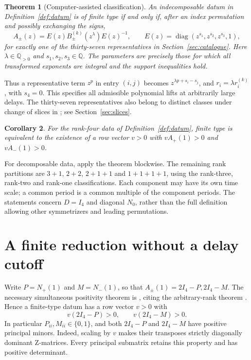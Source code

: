 \documentclass[11pt,a4paper]{article}
\newtheorem{theorem}{Theorem}[section]
\newtheorem{corollary}[theorem]{Corollary}
\theoremstyle{definition}
\DeclareMathOperator{\diag}{diag}
\newcommand{\Q}{\mathbb Q}
\begin{document}
\begin{theorem}[Computer-assisted classification]\label{thm:classification}
An indecomposable datum in Definition~\ref{def:datum} is of finite type if and
only if, after an index permutation and possibly exchanging the signs,
\begin{equation}\label{eq:family}
 A_\pm(z)=E(z)B_\pm^{(k)}(z^\lambda)E(z)^{-1},\qquad
 E(z)=\diag(z^{s_1},z^{s_2},z^{s_3},1),
\end{equation}
for exactly one of the thirty-seven representatives in
Section~\ref{sec:catalogue}. Here $\lambda\in\Q_{>0}$ and
$s_1,s_2,s_3\in\Q$. The parameters are precisely those for which all transformed
exponents are integral and the support inequalities hold.
\end{theorem}

Thus a representative term $z^p$ in entry $(i,j)$ becomes
$z^{\lambda p+s_i-s_j}$, and $r_i=\lambda r_i^{(k)}$, with $s_4=0$.
This specifies all admissible polynomial lifts at arbitrarily large delays.
The thirty-seven representatives also belong to distinct classes under change
of slices in \cite[Section 3.1]{Mizuno}; see Section~\ref{sec:slices}.

\begin{corollary}\label{cor:positivity}
For the rank-four data of Definition~\ref{def:datum}, finite type is equivalent
to the existence of a row vector $v>0$ with
$vA_+(1)>0$ and $vA_-(1)>0$.
\end{corollary}

For decomposable data, apply the theorem blockwise. The remaining rank
partitions are $3+1$, $2+2$, $2+1+1$ and $1+1+1+1$, using the rank-three,
rank-two and rank-one classifications. Each component may have its own time
scale; a common period is a common multiple of the component periods.
The statements concern $D=I_4$ and diagonal $N_0$, rather than the full
definition allowing other symmetrizers and leading permutations.

\section{A finite reduction without a delay cutoff}\label{sec:reduction}
Write $P=N_+(1)$ and $M=N_-(1)$, so that $A_\pm(1)=2I_4-P,2I_4-M$.
The necessary simultaneous positivity theorem is
\cite[Lemma 3.3]{Mizuno}, citing the arbitrary-rank theorem
\cite[Theorem 5.5]{TData}. Hence a finite-type datum has a row vector $v>0$ with
\begin{equation}\label{eq:positive}
 v(2I_4-P)>0,\qquad v(2I_4-M)>0.
\end{equation}
In particular $P_{ii},M_{ii}\in\{0,1\}$, and both $2I_4-P$ and $2I_4-M$
have positive principal minors. Indeed, scaling by $v$ makes their transposes
strictly diagonally dominant Z-matrices. Every principal submatrix retains
this property and has positive determinant.
\end{document}
